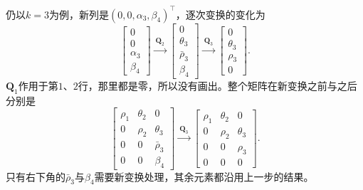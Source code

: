 仍以$k=3$为例，新列是$(0,0,\alpha_3,\beta_4)^\top$，逐次变换的变化为
\[
 \begin{bmatrix}0\\0\\\alpha_3\\\beta_4\end{bmatrix}
 \xrightarrow{\ \bm Q_2\ }
 \begin{bmatrix}0\\\theta_3\\\bar\rho_3\\\beta_4\end{bmatrix}
 \xrightarrow{\ \bm Q_3\ }
 \begin{bmatrix}0\\\theta_3\\\rho_3\\0\end{bmatrix}.
\]
$\bm Q_1$作用于第$1$、$2$行，那里都是零，所以没有画出。整个矩阵在新变换之前与之后分别是
\[
 \begin{bmatrix}
 \rho_1&\theta_2&0\\
 0&\rho_2&\theta_3\\
 0&0&\bar\rho_3\\
 0&0&\beta_4
 \end{bmatrix}
 \xrightarrow{\ \bm Q_3\ }
 \begin{bmatrix}
 \rho_1&\theta_2&0\\
 0&\rho_2&\theta_3\\
 0&0&\rho_3\\
 0&0&0
 \end{bmatrix}.
\]
只有右下角的$\bar\rho_3$与$\beta_4$需要新变换处理，其余元素都沿用上一步的结果。

